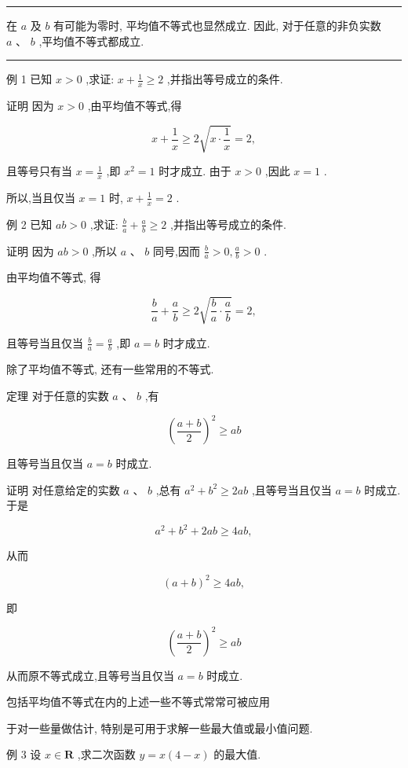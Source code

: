 \documentclass[10pt]{article}
\newcommand{\HRule}{\begin{center}\rule{0.9\linewidth}{0.2mm}\end{center}}
\begin{document}
\HRule

在 \(a\) 及 \(b\) 有可能为零时, 平均值不等式也显然成立. 因此, 对于任意的非负实数 \(a\text{ 、 }b\) ,平均值不等式都成立.

\HRule

例 1 已知 \(x > 0\) ,求证: \(x + \frac{1}{x} \geq  2\) ,并指出等号成立的条件.

证明 因为 \(x > 0\) ,由平均值不等式,得

\[
x + \frac{1}{x} \geq  2\sqrt{x \cdot  \frac{1}{x}} = 2,
\]

且等号只有当 \(x = \frac{1}{x}\) ,即 \({x}^{2} = 1\) 时才成立. 由于 \(x > 0\) ,因此 \(x = 1\) .

所以,当且仅当 \(x = 1\) 时, \(x + \frac{1}{x} = 2\) .

例 2 已知 \({ab} > 0\) ,求证: \(\frac{b}{a} + \frac{a}{b} \geq  2\) ,并指出等号成立的条件.

证明 因为 \({ab} > 0\) ,所以 \(a\text{ 、 }b\) 同号,因而 \(\frac{b}{a} > 0,\frac{a}{b} > 0\) .

由平均值不等式, 得

\[
\frac{b}{a} + \frac{a}{b} \geq  2\sqrt{\frac{b}{a} \cdot  \frac{a}{b}} = 2,
\]

且等号当且仅当 \(\frac{b}{a} = \frac{a}{b}\) ,即 \(a = b\) 时才成立.

除了平均值不等式, 还有一些常用的不等式.

定理 对于任意的实数 \(a\text{ 、 }b\) ,有

\[
{\left( \frac{a + b}{2}\right) }^{2} \geq  {ab}
\]

且等号当且仅当 \(a = b\) 时成立.

证明 对任意给定的实数 \(a\text{ 、 }b\) ,总有 \({a}^{2} + {b}^{2} \geq  {2ab}\) ,且等号当且仅当 \(a = b\) 时成立. 于是

\[
{a}^{2} + {b}^{2} + {2ab} \geq  {4ab},
\]

从而

\[
{\left( a + b\right) }^{2} \geq  {4ab},
\]

即

\[
{\left( \frac{a + b}{2}\right) }^{2} \geq  {ab}
\]

从而原不等式成立,且等号当且仅当 \(a = b\) 时成立.

包括平均值不等式在内的上述一些不等式常常可被应用





于对一些量做估计, 特别是可用于求解一些最大值或最小值问题.

例 3 设 \(x \in  \mathbf{R}\) ,求二次函数 \(y = x\left( {4 - x}\right)\) 的最大值.
\end{document}
